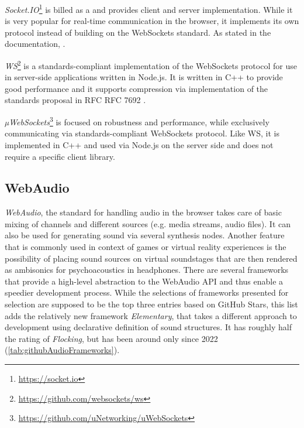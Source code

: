 

\emph{Socket.IO}\footnote{\url{https://socket.io}} is billed as a  and provides client and server implementation. While it is very popular for real-time communication in the browser, it implements its own protocol instead of building on the WebSockets standard. As stated in the documentation, .

\emph{WS}\footnote{\url{https://github.com/websockets/ws}} is a standards-compliant implementation of the WebSockets protocol for use in server-side applications written in Node.js. It is written in C++ to provide good performance and it supports compression via implementation of the standards proposal in \ac{RFC} RFC 7692 .

\emph{µWebSockets}\footnote{\url{https://github.com/uNetworking/uWebSockets}} is focused on robustness and performance, while exclusively communicating via standards-compliant WebSockets protocol. Like WS, it is implemented in C++ and used via Node.js on the server side and does not require a specific client library.

\subsection{WebAudio}

\emph{WebAudio}, the standard for handling audio in the browser takes care of basic mixing of channels and different sources (e.g. media streams, audio files). It can also be used for generating sound via several synthesis nodes. Another feature that is commonly used in context of games or virtual reality experiences is the possibility of placing sound sources on virtual soundstages that are then rendered as ambisonics for psychoacoustics in headphones. There are several frameworks that provide a high-level abstraction to the WebAudio \ac{API} and thus enable a speedier development process. While the selections of frameworks presented for selection are supposed to be the top three entries based on GitHub Stars, this list adds the relatively new framework \emph{Elementary}, that takes a different approach to development using declarative definition of sound structures. It has roughly half the rating of \emph{Flocking}, but has been around only since 2022 (\ref{tab:githubAudioFrameworks}).

